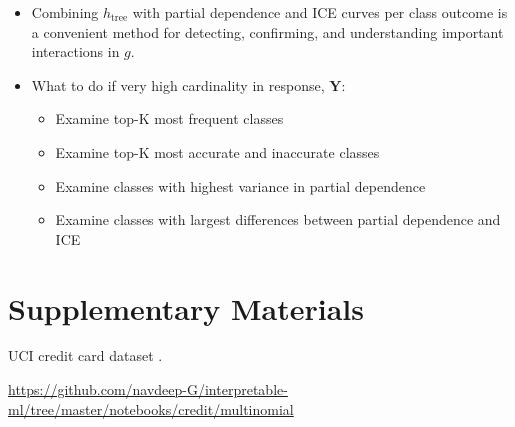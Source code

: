 \documentclass{article}
\begin{document}
\begin{itemize}

\item Combining $h_{\text{tree}}$ with partial dependence and ICE curves per class outcome is a convenient method for detecting, confirming, and understanding important interactions in $g$.

\item What to do if very high cardinality in response, $\mathbf{Y}$:

\begin{itemize}

  \item Examine top-K most frequent classes
  \item Examine top-K most accurate and inaccurate classes
  \item Examine classes with highest variance in partial dependence
  \item Examine classes with largest differences between partial dependence and ICE
  
\end{itemize}

\end{itemize}

\section{Supplementary Materials}


UCI credit card dataset \cite{uci}.

\begin{center}
  \url{https://github.com/navdeep-G/interpretable-ml/tree/master/notebooks/credit/multinomial}
\end{center}

\end{document}
